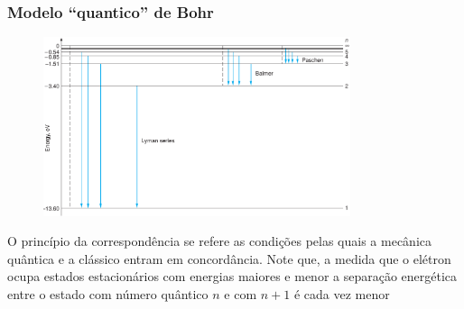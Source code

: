 \documentclass[12pt,brazil]{beamer}
\begin{document}
\begin{frame}
  \frametitle{Modelo ``quantico'' de Bohr}
  \fontsize{9pt}{11pt}\selectfont
     
        \begin{figure}
        \includegraphics[width=9cm]{figuras/fig08}
        \end{figure}
        
        
  O princípio da correspondência se refere as condições pelas quais a mecânica quântica e a clássico entram em concordância. Note que, a medida que o elétron ocupa estados estacionários com energias maiores e menor a separação energética entre o estado com número quântico $n$ e com $n+1$ é cada vez menor 
\end{frame}
        
\end{document}
